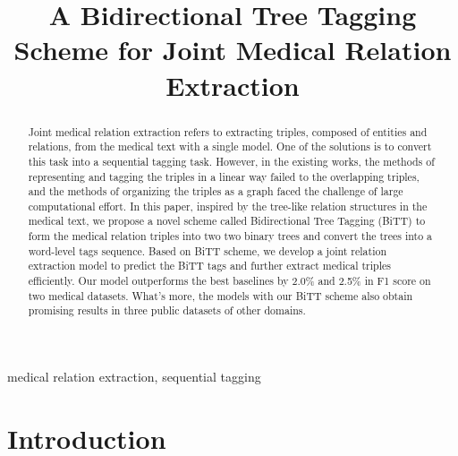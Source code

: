 \documentclass[conference]{IEEEtran}
\begin{document}
\title{A Bidirectional Tree Tagging Scheme for Joint Medical Relation Extraction}

\author{
\and
{}
\and
{}
\and
{}
}

\maketitle

\begin{abstract}
    Joint medical relation extraction refers to extracting triples, composed of entities and relations, from the medical text with a single model. One of the solutions is to convert this task into a sequential tagging task. However, in the existing works, the methods of representing and tagging the triples in a linear way failed to the overlapping triples, and the methods of organizing the triples as a graph faced the challenge of large computational effort. In this paper, inspired by the tree-like relation structures in the medical text, we propose a novel scheme called Bidirectional Tree Tagging (BiTT) to form the medical relation triples into two two binary trees and convert the trees into a word-level tags sequence. Based on BiTT scheme, we develop a joint relation extraction model to predict the BiTT tags and further extract medical triples efficiently. Our model outperforms the best baselines by 2.0\% and 2.5\% in F1 score on two medical datasets. What's more, the models with our BiTT scheme also obtain promising results in three public datasets of other domains.
\end{abstract}

\begin{IEEEkeywords}
medical relation extraction, sequential tagging
\end{IEEEkeywords} \section{Introduction}
\end{document}
